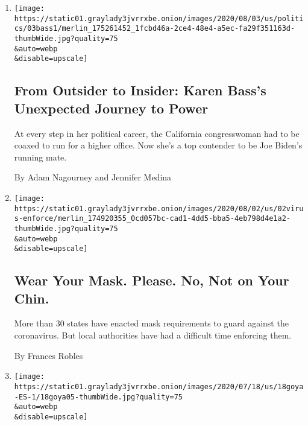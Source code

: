 \begin{enumerate}
\def\labelenumi{\arabic{enumi}.}
\item
  \href{/2020/08/04/us/politics/karen-bass-vice-president-biden.html}{}

  \texttt{[image: https://static01.graylady3jvrrxbe.onion/images/2020/08/03/us/politics/03bass1/merlin\_175261452\_1fcbd46a-2ce4-48e4-a5ec-fa29f351163d-thumbWide.jpg?quality=75\\\&auto=webp\\\&disable=upscale]}

  \hypertarget{from-outsider-to-insider-karen-basss-unexpected-journey-to-power}{%
  \subsection{From Outsider to Insider: Karen Bass's Unexpected Journey
  to
  Power}\label{from-outsider-to-insider-karen-basss-unexpected-journey-to-power}}

  At every step in her political career, the California congresswoman
  had to be coaxed to run for a higher office. Now she's a top contender
  to be Joe Biden's running mate.

  By Adam Nagourney and Jennifer Medina
\item
  \href{/2020/07/31/us/coronavirus-masks-enforcement-key-west.html}{}

  \texttt{[image: https://static01.graylady3jvrrxbe.onion/images/2020/08/02/us/02virus-enforce/merlin\_174920355\_0cd057bc-cad1-4dd5-bba5-4eb798d4e1a2-thumbWide.jpg?quality=75\\\&auto=webp\\\&disable=upscale]}

  \hypertarget{wear-your-mask-please-no-not-on-your-chin}{%
  \subsection{Wear Your Mask. Please. No, Not on Your
  Chin.}\label{wear-your-mask-please-no-not-on-your-chin}}

  More than 30 states have enacted mask requirements to guard against
  the coronavirus. But local authorities have had a difficult time
  enforcing them.

  By Frances Robles
\item
  \href{/es/2020/07/19/espanol/goya-boicot-trump.html}{}

  \texttt{[image: https://static01.graylady3jvrrxbe.onion/images/2020/07/18/us/18goya-ES-1/18goya05-thumbWide.jpg?quality=75\\\&auto=webp\\\&disable=upscale]}

  \hypertarget{goya-y-trump-cuxf3mo-comprar-frijoles-se-convirtiuxf3-en-una-declaraciuxf3n-poluxedtica}{%
}
\end{enumerate}
